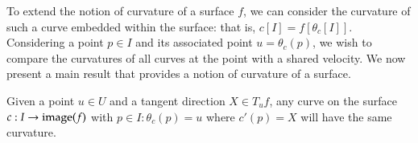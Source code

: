  To extend the notion of curvature of a surface $f$, we can consider the curvature of such a curve embedded within the surface: that is, $c[I] = f[\theta_c[I]]$. Considering a point $p \in I$ and its associated point $u = \theta_c(p)$, we wish to compare the curvatures of all curves at the point with a shared velocity. We now present a main result that provides a notion of curvature of a surface.
	
	\begin{theorem} \label{thm:meusnier}
		Given a point $u \in U $ and a tangent direction $X \in T_u f$,
  any curve on the surface $c: I \to \mathrm{image}(f)$ with $p\in I : \theta_c(p) = u$
  where $c'(p) = X$ will have the same curvature.
	\end{theorem}
	
	

